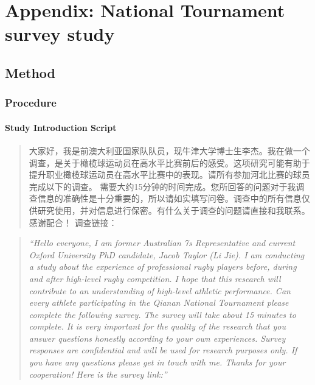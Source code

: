 \chapter{Appendix: National Tournament survey study\label{app8:tournamentSurvey}}












\section{Method\label{app8:method}}



\subsection{Procedure\label{app8:procedure}}


\subsubsection{Study Introduction Script\label{app8:studyIntro}}

\begin{CJK}{UTF8}{gbsn}
  \begin{quote}
    大家好，我是前澳大利亚国家队队员，现牛津大学博士生李杰。我在做一个调查，是关于橄榄球运动员在高水平比赛前后的感受。这项研究可能有助于提升职业橄榄球运动员在高水平比赛中的表现。请所有参加河北比赛的球员完成以下的调查。
    需要大约15分钟的时间完成。您所回答的问题对于我调查信息的准确性是十分重要的，所以请如实填写问卷。调查中的所有信息仅供研究使用，并对信息进行保密。有什么关于调查的问题请直接和我联系。感谢配合！ 调查链接：
  \end{quote}
\end{CJK}

\begin{quote}
      \textit{``Hello everyone, I am former Australian 7s Representative and current Oxford University PhD candidate, Jacob Taylor (Li Jie). I am conducting a study about the experience of professional rugby players before, during and after high-level rugby competition. I hope that this research will contribute to an understanding of high-level athletic performance. Can every athlete participating in the Qianan National Tournament please complete the following survey. The survey will take about 15 minutes to complete. It is very important for the quality of the research that you answer questions honestly according to your own experiences. Survey responses are confidential and will be used for research purposes only. If you have any questions please get in touch with me. Thanks for your cooperation! Here is the survey link:''}
\end{quote}




